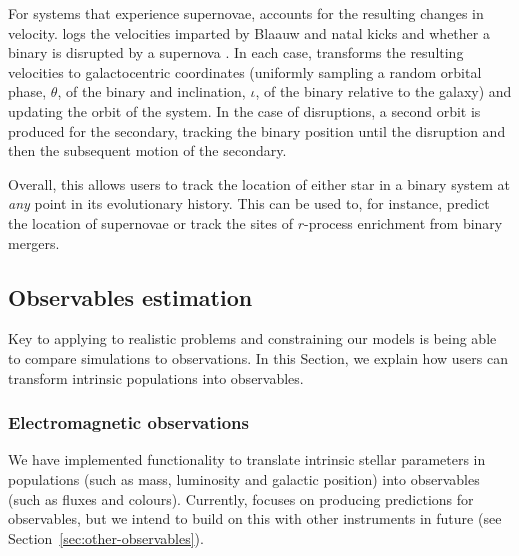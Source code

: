 \documentclass[twocolumn, twocolappendix, oneside]{aastex631}
\begin{document}
For systems that experience supernovae, \cogsworth accounts for the resulting changes in velocity. \cosmic logs the velocities imparted by Blaauw \citep{Blaauw+1961} and natal kicks \citep{Katz+1975:1975Natur.253..698K,Janka+2012:2012ARNPS..62..407J,Janka+2017:2017ApJ...837...84J} and whether a binary is disrupted by a supernova \citep[e.g.,][]{Renzo+2019:2019A&A...624A..66R}. In each case, \cogsworth transforms the resulting velocities to galactocentric coordinates (uniformly sampling a random orbital phase, $\theta$, of the binary and inclination, $\iota$, of the binary relative to the galaxy) and updating the orbit of the system. In the case of disruptions, a second orbit is produced for the secondary, tracking the binary position until the disruption and then the subsequent motion of the secondary.

Overall, this allows users to track the location of either star in a binary system at \textit{any} point in its evolutionary history. This can be used to, for instance, predict the location of supernovae or track the sites of $r$-process enrichment from binary mergers.
\newpage
\subsection{Observables estimation}\label{sec:observables}

Key to applying \cogsworth{} to realistic problems and constraining our models is being able to compare simulations to observations. In this Section, we explain how users can transform intrinsic \cogsworth populations into observables.

\subsubsection{Electromagnetic observations}

We have implemented functionality to translate intrinsic stellar parameters in \cogsworth populations (such as mass, luminosity and galactic position) into observables (such as fluxes and colours). Currently, \cogsworth focuses on producing predictions for \gaia observables, but we intend to build on this with other instruments in future (see Section~\ref{sec:other-observables}). 
\end{document}
